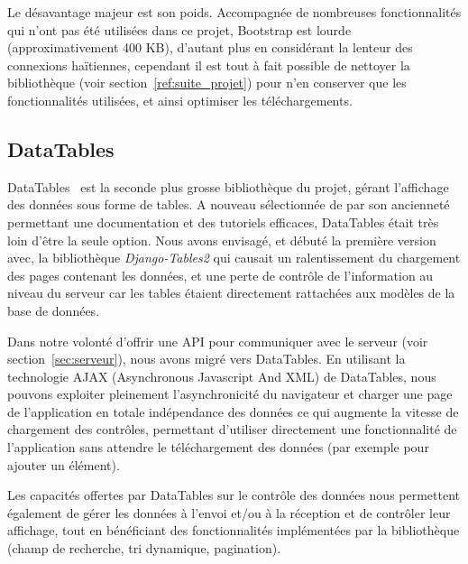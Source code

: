 \documentclass{EPL-master-thesis-covers-FR}
\begin{document}
				Le désavantage majeur est son poids. Accompagnée de nombreuses fonctionnalités qui n'ont pas été utilisées dans ce projet, Bootstrap est lourde (approximativement 400 KB), d'autant plus en considérant la lenteur des connexions haïtiennes, cependant il est tout à fait possible de nettoyer la bibliothèque (voir section~\ref{ref:suite_projet}) pour n'en conserver que les fonctionnalités utilisées, et ainsi optimiser les téléchargements.

			\subsection*{DataTables}

				DataTables~\cite{ref:datatables} est la seconde plus grosse bibliothèque du projet, gérant l'affichage des données sous forme de tables. A nouveau sélectionnée de par son ancienneté permettant une documentation et des tutoriels efficaces, DataTables était très loin d'être la seule option. Nous avons envisagé, et débuté la première version avec, la bibliothèque \emph{Django-Tables2} qui causait un ralentissement du chargement des pages contenant les données, et une perte de contrôle de l'information au niveau du serveur car les tables étaient directement rattachées aux modèles de la base de données.

				Dans notre volonté d'offrir une API pour communiquer avec le serveur (voir section~\ref{sec:serveur}), nous avons migré vers DataTables. En utilisant la technologie AJAX (Asynchronous Javascript And XML) de DataTables, nous pouvons exploiter pleinement l'asynchronicité du navigateur et charger une page de l'application en totale indépendance des données ce qui augmente la vitesse de chargement des contrôles, permettant d'utiliser directement une fonctionnalité de l'application sans attendre le téléchargement des données (par exemple pour ajouter un élément).

				Les capacités offertes par DataTables sur le contrôle des données nous permettent également de gérer les données à l'envoi et/ou à la réception et de contrôler leur affichage, tout en bénéficiant des fonctionnalités implémentées par la bibliothèque (champ de recherche, tri dynamique, pagination).
\end{document}
